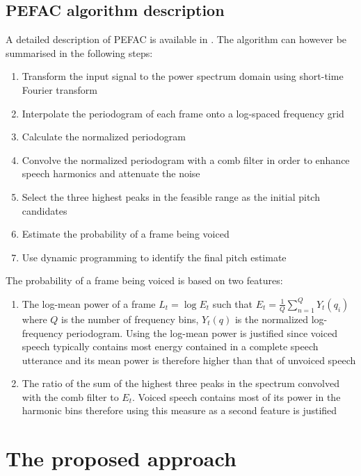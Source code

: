 \subsection{PEFAC algorithm description}

A detailed description of PEFAC is available in \cite{PEFAC}. The algorithm can however be summarised in the following steps:
\begin{enumerate}
\item Transform the input signal to the power spectrum domain using short-time Fourier transform
\item Interpolate the periodogram of each frame onto a log-spaced frequency grid
\item Calculate the normalized periodogram
\item Convolve the normalized periodogram with a comb filter in order to enhance speech harmonics and attenuate the noise
\item Select the three highest peaks in the feasible range as the initial pitch candidates
\item Estimate the probability of a frame being voiced
\item Use dynamic programming to identify the final pitch estimate
\end{enumerate}

The probability of a frame being voiced is based on two features:
\begin{enumerate}
\item The log-mean power of a frame $L_t = \log E_t$ such that $E_t = \frac{1}{Q} \sum_{n=1}^{Q} Y_t(q_i)$ where $Q$ is the number of frequency bins, $Y_t(q)$ is the normalized log-frequency periodogram. Using the log-mean power is justified since voiced speech typically contains most energy contained in a complete speech utterance and its mean power is therefore higher than that of unvoiced speech
\item The ratio of the sum of the highest three peaks in the spectrum convolved with the comb filter to $E_t$. Voiced speech contains most of its power in the harmonic bins therefore using this measure as a second feature is justified
\end{enumerate}


\section{The proposed approach}

